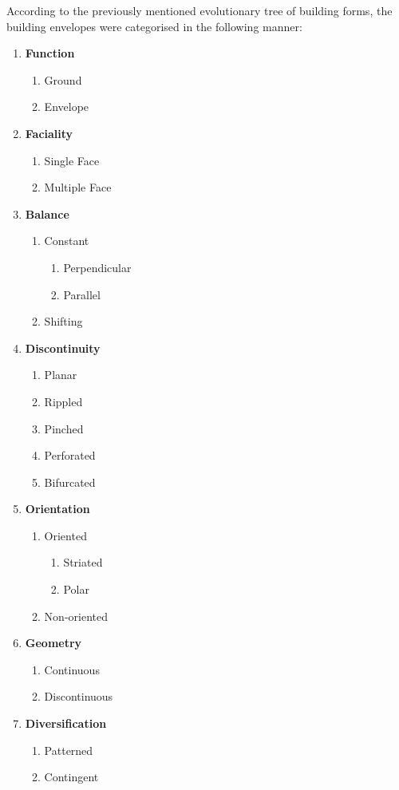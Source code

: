 According to the previously mentioned evolutionary tree of building forms, the building envelopes were categorised in the following manner:

\setlength{\columnseprule}{1pt}
\begin{multicols}{2}
\begin{enumerate}
	\item \textbf{Function}
		\begin{enumerate}
		\item Ground
		\item Envelope
		\end{enumerate}
	\item \textbf{Faciality}
		\begin{enumerate}
			\item Single Face
			\item Multiple Face
		\end{enumerate}
	\item \textbf{Balance}
		\begin{enumerate}
			\item Constant
				\begin{enumerate}
					\item Perpendicular
					\item Parallel
				\end{enumerate}
			\item Shifting
		\end{enumerate}
	\item \textbf{Discontinuity}
		\begin{enumerate}
			\item Planar
			\item Rippled
			\item Pinched
			\item Perforated
			\item Bifurcated
		\end{enumerate}
	\item \textbf{Orientation}
		\begin{enumerate}
			\item Oriented
				\begin{enumerate}
					\item Striated
					\item Polar
				\end{enumerate}
			\item Non-oriented
		\end{enumerate}
	\item \textbf{Geometry}
		\begin{enumerate}
			\item Continuous
			\item Discontinuous
		\end{enumerate}
	\item \textbf{Diversification}
		\begin{enumerate}
			\item Patterned
			\item Contingent
		\end{enumerate}
\end{enumerate}
\end{multicols}



